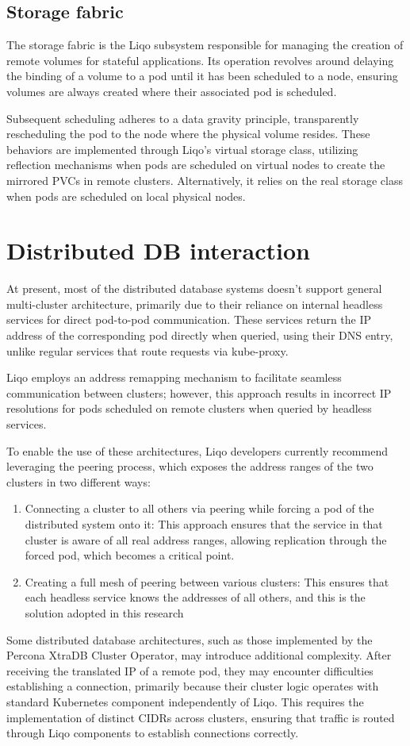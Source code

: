 \subsection{Storage fabric}
The storage fabric is the Liqo subsystem responsible for managing the creation of remote volumes for stateful applications. Its operation revolves around delaying the binding of a volume to a pod until it has been scheduled to a node, ensuring volumes are always created where their associated pod is scheduled. 

Subsequent scheduling adheres to a data gravity principle, transparently rescheduling the pod to the node where the physical volume resides. These behaviors are implemented through Liqo's virtual storage class, utilizing reflection mechanisms when pods are scheduled on virtual nodes to create the mirrored PVCs in remote clusters. Alternatively, it relies on the real storage class when pods are scheduled on local physical nodes.

\section{Distributed DB interaction}
At present, most of the distributed database systems doesn't support general multi-cluster architecture, primarily due to their reliance on internal headless services for direct pod-to-pod communication. These services return the IP address of the corresponding pod directly when queried, using their DNS entry, unlike regular services that route requests via kube-proxy. 

Liqo employs an address remapping mechanism to facilitate seamless communication between clusters; however, this approach results in incorrect IP resolutions for pods scheduled on remote clusters when queried by headless services.

To enable the use of these architectures, Liqo developers currently recommend\cite{l2-1} leveraging the peering process, which exposes the address ranges of the two clusters in two different ways:
\begin{enumerate}
\item Connecting a cluster to all others via peering while forcing a pod of the distributed system onto it: This approach ensures that the service in that cluster is aware of all real address ranges, allowing replication through the forced pod, which becomes a critical point.
\item Creating a full mesh of peering between various clusters: This ensures that each headless service knows the addresses of all others, and this is the solution adopted in this research
\end{enumerate}
Some distributed database architectures, such as those implemented by the Percona XtraDB Cluster Operator, may introduce additional complexity. After receiving the translated IP of a remote pod, they may encounter difficulties establishing a connection, primarily because their cluster logic operates with standard Kubernetes component independently of Liqo. This requires the implementation of distinct CIDRs across clusters, ensuring that traffic is routed through Liqo components to establish connections correctly.